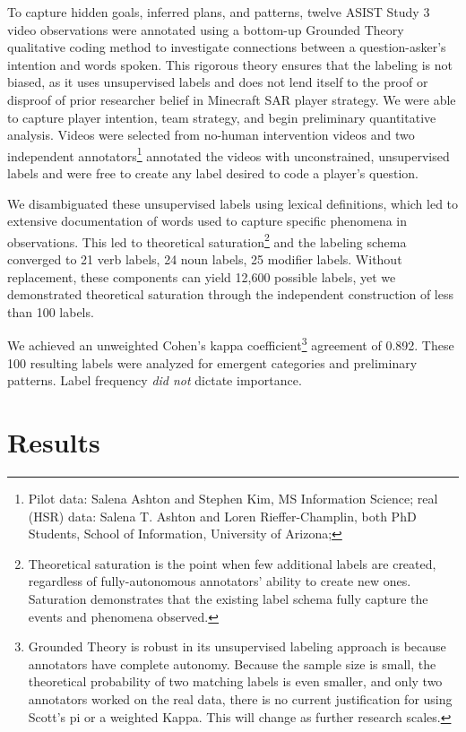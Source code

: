 To capture hidden goals, inferred plans, and patterns, twelve ASIST Study 3
video observations were annotated using a bottom-up Grounded Theory qualitative
coding method to investigate connections between a question-asker's intention
and words spoken. This rigorous theory ensures that the labeling is not biased,
as it uses unsupervised labels and does not lend itself to the proof or
disproof of prior researcher belief in Minecraft SAR player strategy.  We were
able to capture player intention, team strategy, and begin preliminary
quantitative analysis. Videos were selected from no-human intervention videos
and two independent annotators\footnote{Pilot data: Salena Ashton and Stephen
    Kim, MS Information Science; real (HSR) data: Salena T. Ashton and Loren
Rieffer-Champlin, both PhD Students, School of Information, University of
Arizona; } annotated the videos with unconstrained, unsupervised labels and
were free to create any label desired to code a player's question.

We disambiguated these unsupervised labels using lexical definitions, which led
to extensive documentation of words used to capture specific phenomena in
observations. This led to theoretical saturation\footnote{Theoretical
saturation is the point when few additional labels are created, regardless of
fully-autonomous annotators' ability to create new ones. Saturation
demonstrates that the existing label schema fully capture the events and
phenomena observed.} and the labeling schema converged to 21 verb labels, 24
noun labels, 25 modifier labels. Without replacement, these components can
yield 12,600 possible labels, yet we demonstrated theoretical saturation
through the independent construction of less than 100 labels.

We achieved an unweighted Cohen's kappa coefficient\footnote{Grounded Theory is
    robust in its unsupervised labeling approach is because annotators have
    complete autonomy.  Because the sample size is small, the theoretical
    probability of two matching labels is even smaller, and only two annotators
worked on the real data, there is no current justification for using Scott's pi
or a weighted Kappa. This will change as further research scales.} agreement of
0.892. These 100 resulting labels were analyzed for emergent categories and
preliminary patterns. Label frequency \emph{did not} dictate importance.

\section{Results}

